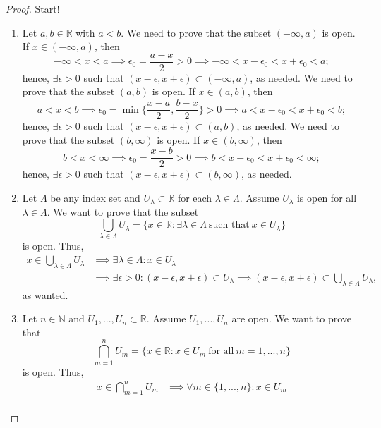 \documentclass[12pt]{article}
\theoremstyle{definition}
\begin{document}
\begin{proof}
    Start!
    \begin{enumerate}[label=(\alph*)]
        \item Let $a,b \in \mathbb{R}$ with $a < b$. We need to prove that the subset $(-\infty, a)$ is open. If $x \in (-\infty, a)$, then
        \[
            -\infty < x < a \implies \epsilon_0 = \frac{a - x}{2} > 0 \implies -\infty < x - \epsilon_0 < x + \epsilon_0 < a;
        \]
        hence, $\exists \epsilon > 0$ such that $(x - \epsilon, x + \epsilon) \subset (-\infty, a)$, as needed. We need to prove that the subset $(a, b)$ is open. If $x \in (a, b)$, then
        \[
            a < x < b \implies \epsilon_0 = \min\bigg\{\frac{x - a}{2}, \frac{b - x}{2}\bigg\} > 0 \implies a < x - \epsilon_0 < x + \epsilon_0 < b;
        \]
        hence, $\exists \epsilon > 0$ such that $(x - \epsilon, x + \epsilon) \subset (a, b)$, as needed. We need to prove that the subset $(b, \infty)$ is open. If $x \in (b, \infty)$, then
        \[
            b < x < \infty \implies \epsilon_0 = \frac{x - b}{2} > 0 \implies b < x - \epsilon_0 < x + \epsilon_0 < \infty;
        \]
        hence, $\exists \epsilon > 0$ such that $(x - \epsilon, x + \epsilon) \subset (b, \infty)$, as needed.
        \item Let $\Lambda$ be any index set and $U_{\lambda} \subset \mathbb{R}$ for each $\lambda \in \Lambda$. Assume $U_{\lambda}$ is open for all $\lambda \in \Lambda$. We want to prove that the subset 
        \[
            \bigcup_{\lambda \in \Lambda}U_{\lambda} = \{x \in \mathbb{R} : \exists \lambda \in \Lambda \ \text{such that} \ x \in U_{\lambda}\}
        \]
        is open. Thus,
        \begin{align*}
            x \in \bigcup_{\lambda \in \Lambda}U_{\lambda} &\implies \exists \lambda \in \Lambda : x \in U_{\lambda} \\
            &\implies \exists \epsilon > 0 : (x - \epsilon, x + \epsilon) \subset U_{\lambda} \implies (x - \epsilon, x + \epsilon) \subset \bigcup_{\lambda \in \Lambda}U_{\lambda},
        \end{align*}
        as wanted.
        \item Let $n \in \mathbb{N}$ and $U_1,...,U_n \subset \mathbb{R}$. Assume $U_1,...,U_n$ are open. We want to prove that 
        \[
            \bigcap_{m = 1}^{n}U_m = \{x \in \mathbb{R} : x \in U_m \ \text{for all} \ m = 1,...,n\}
        \]
        is open. Thus,
        \begin{align*}
            x \in \bigcap_{m = 1}^{n}U_m &\implies \forall m \in \{1,...,n\} : x \in U_m \\

\end{align*}
\end{enumerate}
\end{proof}
\end{document}

